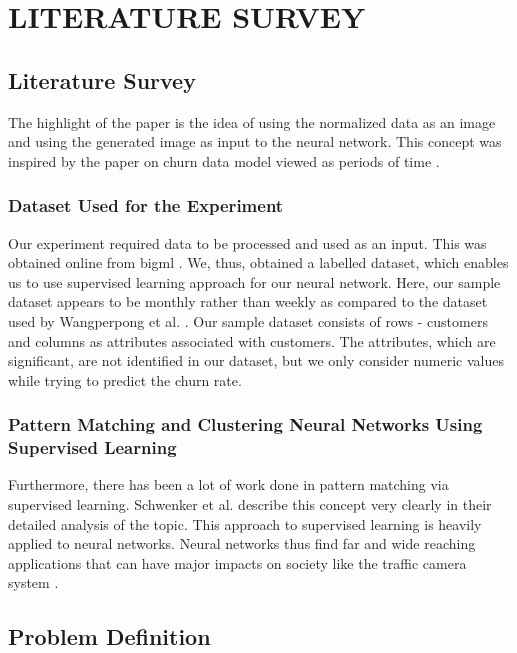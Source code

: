 

\chapter{LITERATURE SURVEY}

\section{Literature Survey}

\hspace{0.9cm} The highlight of the paper is the idea of using the normalized
data as an image and using the generated image as input
to the neural network. This concept was inspired by the paper
on churn data model viewed as periods of time \cite{citation-2}.
\subsection{Dataset Used for the Experiment}
Our experiment required data to be processed and used
as an input. This was obtained online from bigml \cite{citation-12}. We,
thus, obtained a labelled dataset, which enables us to use
supervised learning approach for our neural network. Here,
our sample dataset appears to be monthly rather than weekly
as compared to the dataset used by Wangperpong et al. \cite{citation-4}.
Our sample dataset consists of rows - customers and columns
as attributes associated with customers. The attributes, which
are significant, are not identified in our dataset, but we only
consider numeric values while trying to predict the churn rate.
\subsection{Pattern Matching and Clustering Neural Networks Using Supervised Learning}
Furthermore, there has been a lot of work done in pattern
matching via supervised learning. Schwenker et al. \cite{citation-3} describe
this concept very clearly in their detailed analysis of the
topic. This approach to supervised learning is heavily applied
to neural networks. Neural networks thus find far and
wide reaching applications that can have major impacts on
society like the traffic camera system \cite{citation-5}.

\section{Problem Definition}

